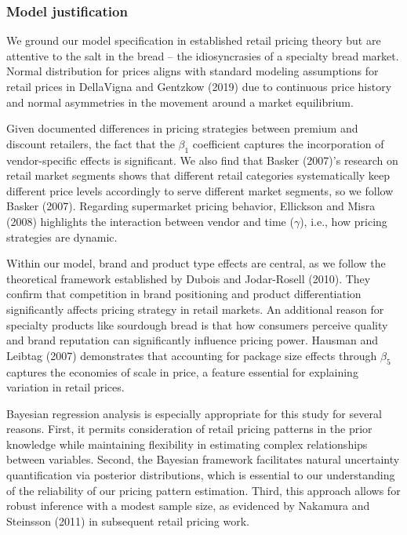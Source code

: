\documentclass[
  letterpaper,
  DIV=11,
  numbers=noendperiod]{scrartcl}
\begin{document}
\subsubsection{Model justification}\label{model-justification}

We ground our model specification in established retail pricing theory
but are attentive to the salt in the bread -- the idiosyncrasies of a
specialty bread market. Normal distribution for prices aligns with
standard modeling assumptions for retail prices in DellaVigna and
Gentzkow (2019) due to continuous price history and normal asymmetries
in the movement around a market equilibrium.

Given documented differences in pricing strategies between premium and
discount retailers, the fact that the \(\beta_1\) coefficient captures
the incorporation of vendor-specific effects is significant. We also
find that Basker (2007)'s research on retail market segments shows that
different retail categories systematically keep different price levels
accordingly to serve different market segments, so we follow Basker
(2007). Regarding supermarket pricing behavior, Ellickson and Misra
(2008) highlights the interaction between vendor and time (\(\gamma\)),
i.e., how pricing strategies are dynamic.

Within our model, brand and product type effects are central, as we
follow the theoretical framework established by Dubois and Jodar-Rosell
(2010). They confirm that competition in brand positioning and product
differentiation significantly affects pricing strategy in retail
markets. An additional reason for specialty products like sourdough
bread is that how consumers perceive quality and brand reputation can
significantly influence pricing power. Hausman and Leibtag (2007)
demonstrates that accounting for package size effects through
\(\beta_5\) captures the economies of scale in price, a feature
essential for explaining variation in retail prices.

Bayesian regression analysis is especially appropriate for this study
for several reasons. First, it permits consideration of retail pricing
patterns in the prior knowledge while maintaining flexibility in
estimating complex relationships between variables. Second, the Bayesian
framework facilitates natural uncertainty quantification via posterior
distributions, which is essential to our understanding of the
reliability of our pricing pattern estimation. Third, this approach
allows for robust inference with a modest sample size, as evidenced by
Nakamura and Steinsson (2011) in subsequent retail pricing work.
\end{document}
